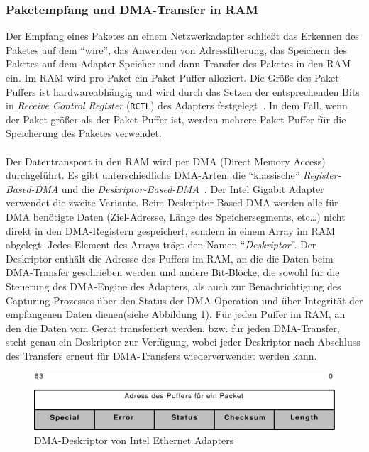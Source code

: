 {\subsubsection*{Paketempfang und DMA-Transfer in RAM}\label{sec:hw_dma} 
Der Empfang eines Paketes an einem Netzwerkadapter schließt das Erkennen des
Paketes auf dem ``wire'', das Anwenden von Adressfilterung, das Speichern des Paketes
auf dem Adapter-Speicher und dann Transfer des Paketes in den RAM ein.  Im RAM
wird pro Paket ein Paket-Puffer alloziert. Die Größe des Paket-Puffers ist
hardwareabhängig und wird durch das Setzen der entsprechenden Bits in
\emph{Receive Control Register} (\verb+RCTL+) des Adapters
festgelegt~\cite{e1000_sdm}. In dem Fall, wenn der Paket größer als der
Paket-Puffer ist, werden mehrere Paket-Puffer für die Speicherung des Paketes
verwendet.\\\\
Der Datentransport in den RAM wird per DMA (Direct Memory Access) durchgeführt. Es
gibt unterschiedliche DMA-Arten: die ``klassische'' \emph{Register-Based-DMA}
und die \emph{Deskriptor-Based-DMA}~\cite{dma_desc_base}. Der Intel Gigabit
Adapter verwendet die zweite Variante. Beim Deskriptor-Based-DMA werden alle
für DMA benötigte Daten (Ziel-Adresse, Länge des Speichersegments, etc\ldots)
nicht direkt in den DMA-Registern gespeichert, sondern in einem Array im RAM
abgelegt. Jedes Element des Arrays trägt den Namen ``\emph{Deskriptor}''.
Der Deskriptor enthält die Adresse des Puffers im RAM, an die die Daten beim
DMA-Transfer geschrieben werden und andere Bit-Blöcke, die sowohl für die
Steuerung des DMA-Engine des Adapters, als auch zur Benachrichtigung des
Capturing-Prozesses über den Status der DMA-Operation und über Integrität der
empfangenen Daten dienen(siehe Abbildung \ref{dma-e1000-desc}). Für jeden
Puffer im RAM, an den die Daten vom Gerät transferiert werden, bzw. für jeden
DMA-Transfer, steht genau ein Deskriptor zur Verfügung, wobei jeder
Deskriptor nach Abschluss des Transfers erneut für DMA-Transfers
wiederverwendet werden kann.
\begin{figure} 
\centering \includegraphics[width=5.0in]{bilder/Decriptor_e1000}
\caption{DMA-Deskriptor von Intel Ethernet Adapters}
\label{dma-e1000-desc}
\end{figure}
}
